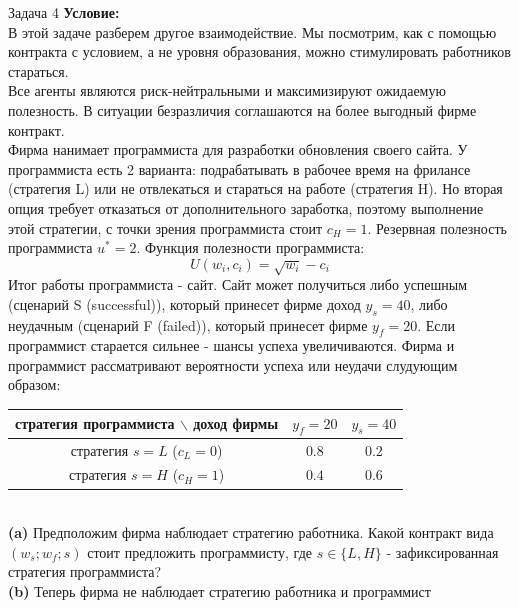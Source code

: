 \begin{mybox}{Задача 4}
    \indent\setlength{\parindent}{1em}\textbf{Условие:}\\
    \indent\setlength{\parindent}{1em}В этой задаче разберем другое взаимодействие. Мы посмотрим, как с помощью
    контракта с условием, а не уровня образования, можно стимулировать работников стараться.\\
    \indent\setlength{\parindent}{1em}Все агенты являются риск-нейтральными и максимизируют ожидаемую полезность. В
    ситуации безразличия соглашаются на более выгодный фирме контракт.\\
    \indent\setlength{\parindent}{1em}Фирма нанимает программиста для разработки обновления своего сайта. У программиста
    есть 2 варианта: подрабатывать в рабочее время на фрилансе (стратегия L) или не отвлекаться и стараться на работе
    (стратегия H). Но вторая опция требует отказаться от дополнительного заработка, поэтому выполнение этой стратегии, с
    точки зрения программиста стоит $c_H=1$. Резервная полезность программиста $u^*=2$. Функция полезности программиста:
    $$U(w_i,c_i)=\sqrt{w_i}-c_i$$
    \indent\setlength{\parindent}{1em}Итог работы программиста - сайт. Сайт может получиться либо успешным (сценарий S
    (successful)), который принесет фирме доход $y_s=40$, либо неудачным (сценарий F (failed)), который принесет фирме
    $y_f=20$. Если программист старается сильнее - шансы успеха увеличиваются. Фирма и программист рассматривают
    вероятности успеха или неудачи слудующим образом:\\
    \begin{center}
        \begin{tabular}{ c|c|c }
             стратегия программиста $\backslash$ доход фирмы & $y_f=20$ & $y_s=40$ \\
             \hline
             стратегия $s=L$ ($c_L=0$) & $0.8$ & $0.2$ \\
             \hline
             стратегия $s=H$ ($c_H=1$) & $0.4$ & $0.6$ \\
        \end{tabular}
    \end{center}\smallskip\\
    \indent\setlength{\parindent}{1em}\indent\setlength{\parindent}{1em}\textbf{(a)} Предположим фирма наблюдает стратегию работника. Какой
    контракт вида $(w_s;w_f;s)$ стоит предложить программисту, где $s\in\{L,H\}$ - зафиксированная стратегия
    программиста?\smallskip\\
    \indent\setlength{\parindent}{1em}\textbf{(b)} Теперь фирма не наблюдает стратегию работника и программист

\end{mybox}
